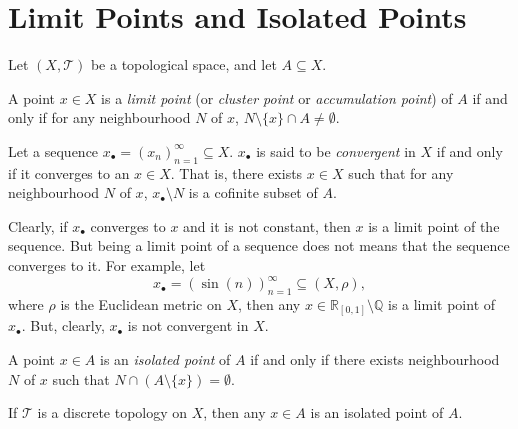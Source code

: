 \section{Limit Points and Isolated Points}


Let $(X, \mathcal T)$ be a topological space, and let $A \subseteq X$.


\begin{definition}
	A point $x \in X$ is a \textit{limit point} (or \textit{cluster point} or \textit{accumulation point}) of $A$ if and only if for any neighbourhood $N$ of $x$, $N \setminus \{x\} \cap A \ne \emptyset$.
\end{definition}


\begin{definition}
	Let a sequence $x_\bullet = (x_n)_{n = 1}^\infty \subseteq X$. $x_\bullet$ is said to be \textit{convergent} in $X$ if and only if it converges to an $x \in X$. That is, there exists $x \in X$ such that for any neighbourhood $N$ of $x$, $x_\bullet \setminus N$ is a cofinite subset of $A$.
\end{definition}


\begin{note}
	Clearly, if $x_\bullet$ converges to $x$ and it is not constant, then $x$ is a limit point of the sequence. But being a limit point of a sequence does not means that the sequence converges to it. For example, let
	$$
	x_\bullet = (\sin(n))_{n = 1}^\infty \subseteq (X, \rho),
	$$
	where $\rho$ is the Euclidean metric on $X$, then any $x \in \mathbb R_{[0,1]} \setminus \mathbb Q$ is a limit point of $x_\bullet$. But, clearly, $x_\bullet$ is not convergent in $X$.
\end{note}


\begin{definition}
	A point $x \in A$ is an \textit{isolated point} of $A$ if and only if there exists neighbourhood $N$ of $x$ such that $N \cap (A \setminus \{x\}) = \emptyset$.
\end{definition}


\begin{example}
	If $\mathcal T$ is a discrete topology on $X$, then any $x \in A$ is an isolated point of $A$.
\end{example}


